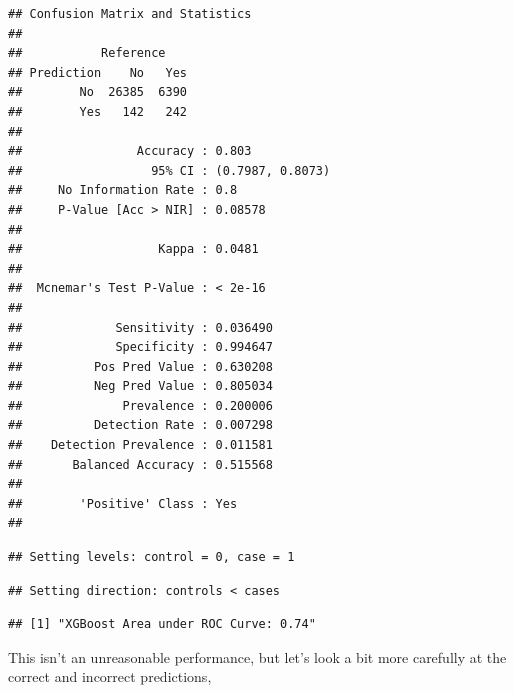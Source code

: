 \documentclass[
]{article}
\newenvironment{Shaded}{\begin{snugshade}}{\end{snugshade}}
\newcommand{\AttributeTok}[1]{\textcolor[rgb]{0.77,0.63,0.00}{#1}}
\newcommand{\DecValTok}[1]{\textcolor[rgb]{0.00,0.00,0.81}{#1}}
\newcommand{\FunctionTok}[1]{\textcolor[rgb]{0.00,0.00,0.00}{#1}}
\newcommand{\NormalTok}[1]{#1}
\newcommand{\SpecialCharTok}[1]{\textcolor[rgb]{0.00,0.00,0.00}{#1}}
\newcommand{\StringTok}[1]{\textcolor[rgb]{0.31,0.60,0.02}{#1}}
\begin{document}
\begin{verbatim}
## Confusion Matrix and Statistics
## 
##           Reference
## Prediction    No   Yes
##        No  26385  6390
##        Yes   142   242
##                                           
##                Accuracy : 0.803           
##                  95% CI : (0.7987, 0.8073)
##     No Information Rate : 0.8             
##     P-Value [Acc > NIR] : 0.08578         
##                                           
##                   Kappa : 0.0481          
##                                           
##  Mcnemar's Test P-Value : < 2e-16         
##                                           
##             Sensitivity : 0.036490        
##             Specificity : 0.994647        
##          Pos Pred Value : 0.630208        
##          Neg Pred Value : 0.805034        
##              Prevalence : 0.200006        
##          Detection Rate : 0.007298        
##    Detection Prevalence : 0.011581        
##       Balanced Accuracy : 0.515568        
##                                           
##        'Positive' Class : Yes             
## 
\end{verbatim}

\begin{Shaded}
\end{Shaded}

\begin{verbatim}
## Setting levels: control = 0, case = 1
\end{verbatim}

\begin{verbatim}
## Setting direction: controls < cases
\end{verbatim}

\begin{verbatim}
## [1] "XGBoost Area under ROC Curve: 0.74"
\end{verbatim}

This isn't an unreasonable performance, but let's look a bit more
carefully at the correct and incorrect predictions,
\end{document}

